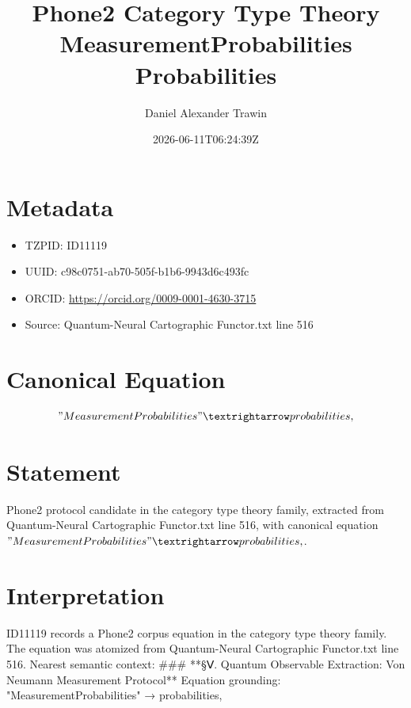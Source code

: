 \documentclass[11pt]{article}
\title{Phone2 Category Type Theory MeasurementProbabilities Probabilities}
\author{Daniel Alexander Trawin}
\date{2026-06-11T06:24:39Z}
\begin{document}
\maketitle
\section*{Metadata}
\begin{itemize}
\item TZPID: ID11119
\item UUID: c98c0751-ab70-505f-b1b6-9943d6c493fc
\item ORCID: \url{https://orcid.org/0009-0001-4630-3715}
\item Source: Quantum-Neural Cartographic Functor.txt line 516
\end{itemize}
\section*{Canonical Equation}
\[
"MeasurementProbabilities" → probabilities,
\]
\section*{Statement}
Phone2 protocol candidate in the category type theory family, extracted from Quantum-Neural Cartographic Functor.txt line 516, with canonical equation $"MeasurementProbabilities" → probabilities,$.
\section*{Interpretation}
ID11119 records a Phone2 corpus equation in the category type theory family. The equation was atomized from Quantum-Neural Cartographic Functor.txt line 516. Nearest semantic context: ### **§Ⅴ. Quantum Observable Extraction: Von Neumann Measurement Protocol** Equation grounding: "MeasurementProbabilities" → probabilities,
\end{document}
